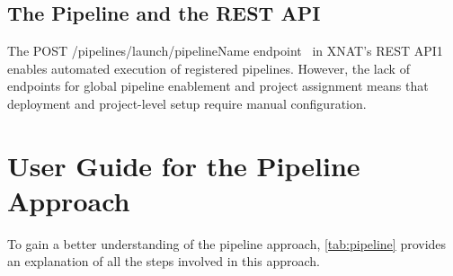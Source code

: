 \normalsize



\subsection{The Pipeline and the REST API}


The POST /pipelines/launch/pipelineName endpoint~\cite{pipelinerestapi} in XNAT's REST API1
 enables automated execution of registered pipelines. However, the lack of endpoints for global pipeline enablement and project assignment means that deployment and project-level setup require manual configuration.

\section{User Guide for the Pipeline Approach}
To gain a better understanding of the pipeline approach, \autoref{tab:pipeline} provides an explanation of all the steps involved in this approach.

